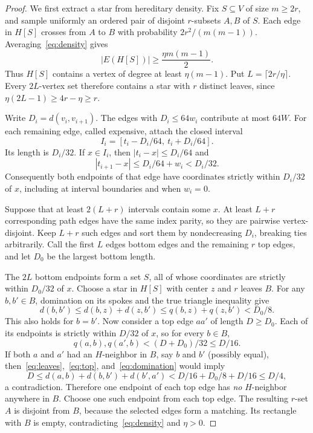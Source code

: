 \documentclass[acmlarge,screen,nonacm,11pt]{acmart}
\begin{document}
\begin{proof}
We first extract a star from hereditary density. Fix $S\subseteq V$ of size $m\geq2r$, and sample uniformly an ordered pair of disjoint $r$-subsets $A,B$ of $S$. Each edge in $H[S]$ crosses from $A$ to $B$ with probability $2r^2/(m(m-1))$. Averaging~\eqref{eq:density} gives
\[
 |E(H[S])|\geq\frac{\eta m(m-1)}2.
\]
Thus $H[S]$ contains a vertex of degree at least $\eta(m-1)$. Put $L=\lceil2r/\eta\rceil$. Every $2L$-vertex set therefore contains a star with $r$ distinct leaves, since $\eta(2L-1)\geq4r-\eta\geq r$.

Write $D_i=d(v_i,v_{i+1})$. The edges with $D_i\leq64w_i$ contribute at most $64W$. For each remaining edge, called expensive, attach the closed interval
\[
 I_i=[t_i-D_i/64,\ t_i+D_i/64].
\]
Its length is $D_i/32$. If $x\in I_i$, then $|t_i-x|\leq D_i/64$ and
\[
 |t_{i+1}-x|\leq D_i/64+w_i<D_i/32.
\]
Consequently both endpoints of that edge have coordinates strictly within $D_i/32$ of $x$, including at interval boundaries and when $w_i=0$.

Suppose that at least $2(L+r)$ intervals contain some $x$. At least $L+r$ corresponding path edges have the same index parity, so they are pairwise vertex-disjoint. Keep $L+r$ such edges and sort them by nondecreasing $D_i$, breaking ties arbitrarily. Call the first $L$ edges bottom edges and the remaining $r$ top edges, and let $D_0$ be the largest bottom length.

The $2L$ bottom endpoints form a set $S$, all of whose coordinates are strictly within $D_0/32$ of $x$. Choose a star in $H[S]$ with center $z$ and $r$ leaves $B$. For any $b,b'\in B$, domination on its spokes and the true triangle inequality give
\begin{equation}\label{eq:leaves}
 d(b,b')\leq d(b,z)+d(z,b')
 \leq q(b,z)+q(z,b')<D_0/8.
\end{equation}
This also holds for $b=b'$. Now consider a top edge $aa'$ of length $D\geq D_0$. Each of its endpoints is strictly within $D/32$ of $x$, so for every $b\in B$,
\begin{equation}\label{eq:top}
 q(a,b),q(a',b)<(D+D_0)/32\leq D/16.
\end{equation}
If both $a$ and $a'$ had an $H$-neighbor in $B$, say $b$ and $b'$ (possibly equal), then~\eqref{eq:leaves},~\eqref{eq:top}, and~\eqref{eq:domination} would imply
\[
 D\leq d(a,b)+d(b,b')+d(b',a')
 <D/16+D_0/8+D/16\leq D/4,
\]
a contradiction. Therefore one endpoint of each top edge has \emph{no} $H$-neighbor anywhere in $B$. Choose one such endpoint from each top edge. The resulting $r$-set $A$ is disjoint from $B$, because the selected edges form a matching. Its rectangle with $B$ is empty, contradicting~\eqref{eq:density} and $\eta>0$.


\end{proof}
\end{document}
